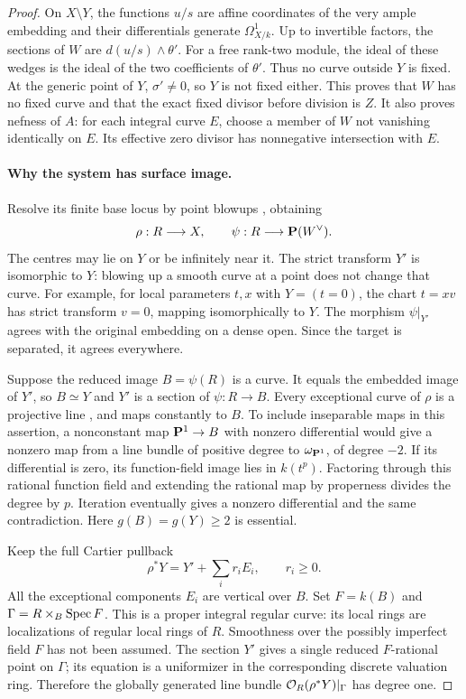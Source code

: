 \begin{proof}
On $X\setminus Y$, the functions $u/s$ are affine coordinates of the
very ample embedding and their differentials generate $\Omega^1_{X/k}$.
Up to invertible factors, the sections of $W$ are
$d(u/s)\wedge\theta'$. For a free rank-two module, the ideal of these
wedges is the ideal of the two coefficients of $\theta'$.
Thus no curve outside $Y$ is fixed. At the generic point of $Y$,
$\sigma'\ne0$, so $Y$ is not fixed either. This proves that $W$ has
no fixed curve and that the exact fixed divisor before division is $Z$.
It also proves nefness of $A$: for each integral curve $E$, choose a
member of $W$ not vanishing identically on $E$. Its effective zero
divisor has nonnegative intersection with $E$.

\paragraph{Why the system has surface image.}
Resolve its finite base locus by point blowups
\cite[Lemma~54.4.3, Tag~0C5H]{Stacks}, obtaining
\[
 \rho:R\longrightarrow X,\qquad
 \psi:R\longrightarrow\mathbf P(W^\vee).
\]
The centres may lie on $Y$ or be infinitely near it.
The strict transform $Y'$ is isomorphic to $Y$: blowing up a smooth
curve at a point does not change that curve. For example, for local
parameters $t,x$ with $Y=(t=0)$, the chart $t=xv$ has strict transform
$v=0$, mapping isomorphically to $Y$.
The morphism $\psi|_{Y'}$ agrees with the original embedding on a dense
open. Since the target is separated, it agrees everywhere.

Suppose the reduced image $B=\psi(R)$ is a curve. It equals the
embedded image of $Y'$, so $B\simeq Y$ and $Y'$ is a section of
$\psi:R\to B$. Every exceptional curve of $\rho$ is a projective line
\cite[Section~54.3, Tag~0AGP]{Stacks}, and maps constantly to $B$.
To include inseparable maps in this assertion, a nonconstant map
$\mathbf P^1\to B$ with nonzero differential would give a nonzero map from
a line bundle of positive degree to $\omega_{\mathbf P^1}$, of degree $-2$.
If its differential is zero, its function-field image lies in
$k(t^p)$. Factoring through this rational function field and extending
the rational map by properness divides the degree by $p$.
Iteration eventually gives a nonzero differential and the same
contradiction. Here $g(B)=g(Y)\geq2$ is essential.

Keep the full Cartier pullback
\[
 \rho^*Y=Y'+\sum_i r_iE_i,\qquad r_i\geq0.
\]
All the exceptional components $E_i$ are vertical over $B$.
Set $F=k(B)$ and $\Gamma=R\times_B\operatorname{Spec} F$.
This is a proper integral regular curve: its local rings are
localizations of regular local rings of $R$.
Smoothness over the possibly imperfect field $F$ has not been assumed.
The section $Y'$ gives a single reduced $F$-rational point on $\Gamma$;
its equation is a uniformizer in the corresponding discrete valuation
ring. Therefore the globally generated line bundle
$\mathcal O_R(\rho^*Y)|_\Gamma$ has degree one.


\end{proof}
